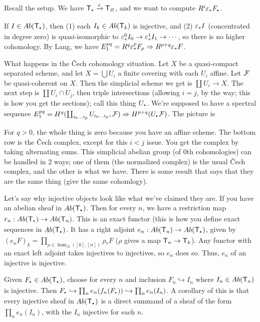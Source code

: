 
Recall the setup. We have $\T_\udot\xrightarrow\e \T_\varnothing$,
and we want to compute $R^i\e_*F_\udot$.

If $I\in Ab(\T_\udot)$, then (1) each $I_k\in Ab(\text{\sf T}_k)$ is injective,
and (2) $\varepsilon_*I$ (concentrated in degree zero) is quasi-isomorphic to
$\varepsilon_*^0I_0 \to \varepsilon_*^1 I_1\to \cdots$, so there is no higher
cohomology. By Lang, we have $E^{pq}_1=R^q\varepsilon^p_*F_p\Rightarrow
R^{p+q}\varepsilon_*F$.

\begin{example}
 What happens in the \v Cech cohomology situation. Let $X$ be a
quasi-compact separated scheme, and let $X=\bigcup U_i$ a finite
covering with each $U_i$ affine. Let $\mathcal{F}$ be quasi-coherent on $X$.
Then the simplicial scheme we get is $\coprod U_i\to X$. The next
step is $\coprod U_i\cap U_j$, then triple intersections (allowing
$i=j$, by the way; this is how you get the sections); call this thing
$U_\udot$. We're supposed to have a spectral sequence
$E^{pq}_1=H^q(\coprod_{i_0\dots i_p}U_{i_0\dots i_p}, \F)\Rightarrow
H^{p+q}(U_\udot  \F)$. The picture is


 For $q>0$, the whole thing is zero because you have an affine
scheme. The bottom row is the \v Cech complex, except for this $i<j$
issue. You get the complex by taking alternating sums. This
simplicial abelian group (of 0th cohomologies) can be handled in 2
ways; one of them (the normalized complex) is the usual \v Cech
complex, and the other is what we have. There is some result that
says that they are the same thing (give the same cohomlogy).
\end{example}

Let's say why injective objects look like what we've claimed they
are. If you have an abelian sheaf in $Ab(\T_\udot)$. Then for every
$n$, we have a restriction map $r_n:Ab(\T_\udot)\to Ab(\T_n)$. This
is an exact functor (this is how you define exact sequences in
$Ab(\T_\udot)$. It has a right adjoint $e_n:Ab(\T_n)\to
Ab(\T_\udot)$, given by $(e_n F)_k= \prod_{\rho\in
\hom_\Delta([k],[n])} \rho_* F$ ($\rho$ gives a map $\text{\sf T}_n\to \text{\sf T}_k$).
Any functor with an exact left adjoint takes injectives to
injectives, so $e_n$ does so. Thus, $e_n$ of an injective is
injective.

Given $F_\udot \in Ab(\T_\udot)$, choose for every $n$ and inclusion
$F_n\hookrightarrow I_n$ where $I_n\in Ab(\text{\sf T}_n)$ is injective. Then
$F_\udot \hookrightarrow \prod_n e_n(f_n(F_\udot))\hookrightarrow
\prod_n e_n(I_n)$. A corollary of this is that every injective sheaf
in $Ab(\T_\udot)$ is a direct summand of a sheaf of the form $\prod_n
e_n(I_n)$, with the $I_n$ injective for each $n$.

